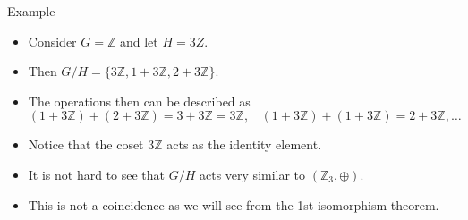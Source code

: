 \documentclass[ %
 10pt, xcolor={dvipsnames,svgnames,x11names,hyperref},
   hyperref={colorlinks=true,citecolor=green,linkcolor=DarkRed,urlcolor=ProcessBlue,anchorcolor=blue}
  ]{beamer}
\newenvironment{stepitemize}{\begin{itemize}[<+->]}{\end{itemize} }
\newcommand{\Z}{\mathbb{Z}}
\begin{document}
\begin{frame}{Example}
\begin{stepitemize}
\item Consider $G = \Z$ and let $H=3Z$.
\item Then $G/H = \{3\Z, 1+3\Z, 2+3\Z\}$.
\item The operations then can be described as
$$(1+3\Z)+(2+3\Z) = 3+3\Z = 3\Z, \:\:\:\: (1+3\Z)+(1+3\Z) = 2+3\Z, \dots$$
\item Notice that the coset $3\Z$ acts as the identity element.
\item It is not hard to see that $G/H$ acts very similar to $(\Z_3, \oplus)$.
\item This is not a coincidence as we will see from the 1st isomorphism theorem.
\end{stepitemize}
\end{frame}
\end{document}
